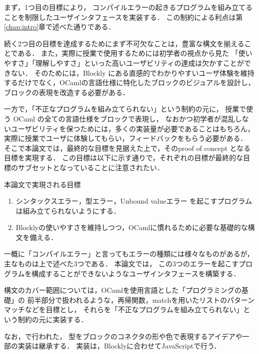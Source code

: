 まず，1つ目の目標により，
コンパイルエラーの起きるプログラムを組み立てることを制限したユーザインタフェースを実装する．
この制約による利点は第\ref{chap:intro}章で述べた通りである．

続く2つ目の目標を達成するためにまず不可欠なことは，豊富な構文を揃えることである．
また，実際に授業で使用するためには初学者の視点から見た
「使いやすさ」「理解しやすさ」といった高いユーザビリティの達成は欠かすことができない．
そのためには，Blockly にある直感的でわかりやすいユーザ体験を維持するだけでなく，OCamlの言語仕様に特化したブロックのビジュアルを設計し，ブロックの表現を改造する必要がある．

一方で，「不正なプログラムを組み立てられない」という制約の元に，
授業で使う OCaml の全ての言語仕様をブロックで表現し，
なおかつ初学者が混乱しないユーザビリティを保つためには，多くの実装量が必要であることはもちろん，
実際に授業でユーザに体験してもらい，フィードバックをもらう必要がある．
そこで本論文では，最終的な目標を見据えた上で，そのproof of concept となる目標を実現する．
この目標は以下に示す通りで，それぞれの目標が最終的な目標のサブセットとなっていることに注意されたい．
\begin{itembox}[l]{本論文で実現される目標}
  \begin {enumerate}
    \item シンタックスエラー，型エラー，Unbound valueエラー \footnotemark[1]を起こすプログラムは組み立てられないようにする．
    \item Blocklyの使いやすさを維持しつつ，OCamlに慣れるために必要な基礎的な構文を備える．
  \end {enumerate}
\end{itembox}

一概に「コンパイルエラー」と言ってもエラーの種類には様々なものがあるが，主なものは上で述べた3つである．
本論文では，
この3つのエラーを起こすプログラムを構成することができないようなユーザインタフェースを構築する．

構文のカバー範囲については，OCamlを使用言語とした「プログラミングの基礎」\cite{AsaiBook}の
前半部分で扱われるような，再帰関数，matchを用いたリストのパターンマッチなどを目標とし，
それらを「不正なプログラムを組み立てられない」という制約の元に実装する．

なお，\cite{Typed-Blockly}で行われた，
型をブロックのコネクタの形や色で表現するアイデアや一部の実装は継承する．
実装は，Blocklyに合わせてJavaScriptで行う．
